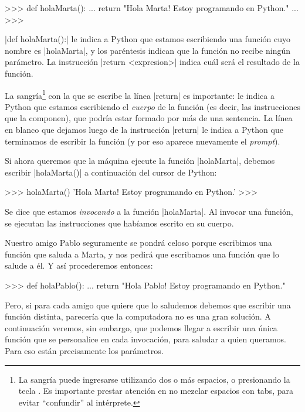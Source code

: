 \begin{codigo-python-sn}
>>> def holaMarta():
...     return "Hola Marta! Estoy programando en Python."
...
>>>
\end{codigo-python-sn}

|def holaMarta():| le indica a Python que estamos escribiendo una función cuyo
nombre es |holaMarta|, y los paréntesis indican que la función no recibe ningún
parámetro.  La instrucción |return <expresion>| indica cuál será el resultado
de la función.

La sangría\footnote{La sangría puede ingresarse utilizando dos o más espacios,
o presionando la tecla . Es importante prestar atención en no mezclar
espacios con tabs, para evitar ``confundir'' al intérprete.} con la que se
escribe la línea |return| es importante: le indica a Python que estamos
escribiendo el {\it cuerpo} de la función (es decir, las instrucciones que la
componen), que podría estar formado por más de una sentencia.  La línea en
blanco que dejamos luego de la instrucción |return| le indica a Python que
terminamos de escribir la función (y por eso aparece nuevamente el {\it
prompt}).

Si ahora queremos que la máquina ejecute la función |holaMarta|, debemos
escribir |holaMarta()| a continuación del cursor de Python:

\begin{codigo-python-sn}
>>> holaMarta()
'Hola Marta! Estoy programando en Python.'
>>>
\end{codigo-python-sn}

Se dice que estamos {\it invocando} a la función |holaMarta|.  Al invocar una
función, se ejecutan las instrucciones que habíamos escrito en su cuerpo.

Nuestro amigo Pablo seguramente se pondrá celoso porque escribimos
una función que saluda a Marta, y nos pedirá que escribamos una
función que lo salude a él. Y así procederemos entonces:

\begin{codigo-python-sn}
>>> def holaPablo():
...     return "Hola Pablo! Estoy programando en Python."
\end{codigo-python-sn}

Pero, si para cada amigo que quiere que lo saludemos debemos que
escribir una función distinta, parecería que la computadora no es
una gran solución. A continuación veremos, sin embargo, que
podemos llegar a escribir una única función que se personalice en
cada invocación, para saludar a quien queramos. Para eso están
precisamente los parámetros.

